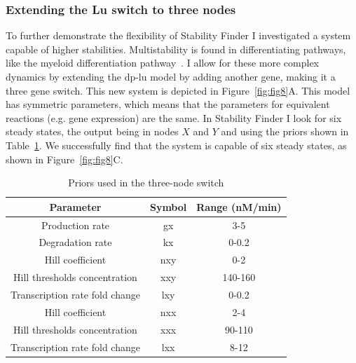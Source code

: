 \subsubsection{Extending the Lu switch to three nodes}
To further demonstrate the flexibility of Stability Finder I investigated a system capable of higher stabilities. Multistability is found in differentiating pathways, like the myeloid differentiation pathway~\autocite{Ghaffarizadeh:2014bt, Cinquin:2005go}. I allow for these more complex dynamics by extending the \acrshort{dp-lu} model by adding another gene, making it a three gene switch.  This new system is depicted in Figure~\ref{fig:fig8}A. This model has symmetric parameters, which means that the parameters for equivalent reactions (e.g. gene expression) are the same. In Stability Finder I look for six steady states, the output being in nodes $X$ and $Y$ and using the priors shown in Table~\ref{tab:multi_priors}. We successfully find that the system is capable of six steady states, as shown in Figure~\ref{fig:fig8}C. 

\begin{table}[htpb]
\centering
\caption{Priors used in the three-node switch}
\label{tab:multi_priors}
\begin{tabular}{@{}ccc@{}}
\toprule
Parameter                           & Symbol & Range (nM/min)  \\ \midrule
Production rate                & gx        & 3-5    \\
Degradation rate               & kx        & 0-0.2     \\
Hill coefficient               & nxy       & 0-2    \\
Hill thresholds concentration  & xxy       & 140-160 \\
Transcription rate fold change & lxy       & 0-0.2     \\
Hill coefficient               & nxx       & 2-4     \\
Hill thresholds concentration  & xxx       & 90-110  \\
Transcription rate fold change & lxx       & 8-12    \\ \bottomrule
\end{tabular}
\end{table}

